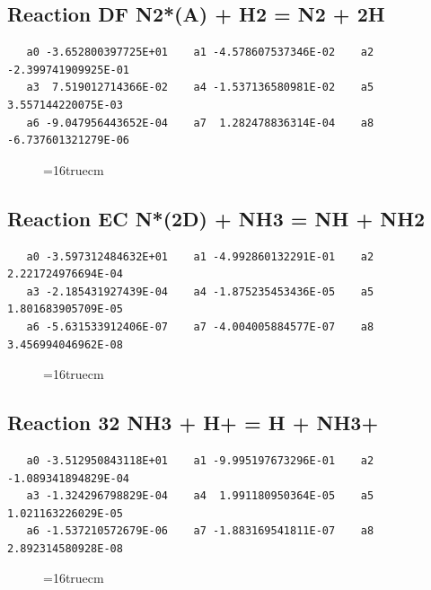 \documentclass[12pt]{article}
\begin{document}
\subsection{
Reaction DF N2*(A) + H2  = N2 + 2H}
\begin{small}\begin{verbatim}
   a0 -3.652800397725E+01    a1 -4.578607537346E-02    a2 -2.399741909925E-01
   a3  7.519012714366E-02    a4 -1.537136580981E-02    a5  3.557144220075E-03
   a6 -9.047956443652E-04    a7  1.282478836314E-04    a8 -6.737601321279E-06
   \end{verbatim}\end{small}
\begin{figure}[h!] \label{n2rates}
\epsfxsize=16truecm
\end{figure}
\newpage

\subsection{
Reaction EC N*(2D) + NH3  = NH + NH2}
\begin{small}\begin{verbatim}
   a0 -3.597312484632E+01    a1 -4.992860132291E-01    a2  2.221724976694E-04
   a3 -2.185431927439E-04    a4 -1.875235453436E-05    a5  1.801683905709E-05
   a6 -5.631533912406E-07    a7 -4.004005884577E-07    a8  3.456994046962E-08
   \end{verbatim}\end{small}
\begin{figure}[h!] \label{n2rates}
\epsfxsize=16truecm
\end{figure}
\newpage

\subsection{
Reaction 32 NH3 + H+ = H + NH3+}
\begin{small}\begin{verbatim}
   a0 -3.512950843118E+01    a1 -9.995197673296E-01    a2 -1.089341894829E-04
   a3 -1.324296798829E-04    a4  1.991180950364E-05    a5  1.021163226029E-05
   a6 -1.537210572679E-06    a7 -1.883169541811E-07    a8  2.892314580928E-08
   \end{verbatim}\end{small}
\begin{figure}[h!] \label{n2rates}
\epsfxsize=16truecm
\end{figure}
\newpage
\end{document}
